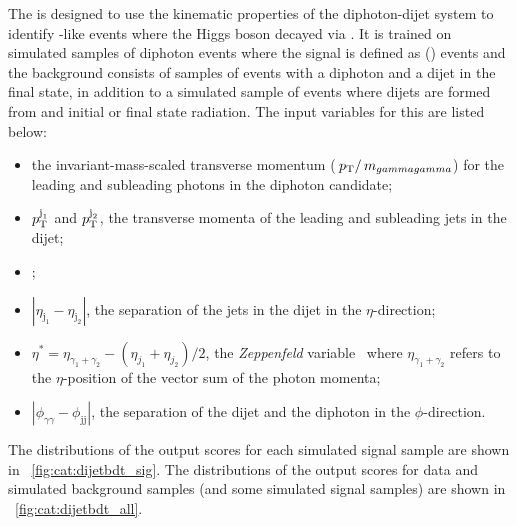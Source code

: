 The \DiJetBdt is designed to use the kinematic properties of the diphoton-dijet system to identify \VBF-like events where the Higgs boson decayed via \Hgg. It is trained on simulated samples of diphoton events where the signal is defined as \VBF (\Hgg) events and the background consists of samples of \SM events with a diphoton and a dijet in the final state, in addition to a simulated sample of \ggH events where dijets are formed from \PU and initial or final state radiation. The input variables for this \BDT are listed below:
\begin{itemize}
\item the invariant-mass-scaled transverse momentum ($\,p_\text{T}/\,m_{gammagamma}$) for the leading and subleading photons in the diphoton candidate;
\item $p_{\mathrm{T}}^{\text{j}_1}$ and $p_{\mathrm{T}}^{\text{j}_2}$, the transverse momenta of the leading and subleading jets in the dijet;
\item \mjj;
\item $|\eta_{\text{j}_1} - \eta_{\text{j}_2}|$, the separation of the jets in the dijet in the $\eta$-direction;
\item $\eta^{*} = \eta_{\gamma_1+\gamma_2} - (\eta_{j_1}+\eta_{j_2})/2$, the \emph{Zeppenfeld} variable~\cite{Zeppenfeld} where $\eta_{\gamma_1+\gamma_2}$ refers to the $\eta$-position of the vector sum of the photon momenta;
\item $|\phi_{\gamma\gamma} - \phi_\text{jj}|$, the separation of the dijet and the diphoton in the $\phi$-direction.
\end{itemize}

The distributions of the \DiJetBdt output scores for each simulated signal sample are shown in \Fig~\ref{fig:cat:dijetbdt_sig}. The distributions of the \DiJetBdt output scores for data and simulated background samples (and some simulated signal samples) are shown in \Fig~\ref{fig:cat:dijetbdt_all}. 

